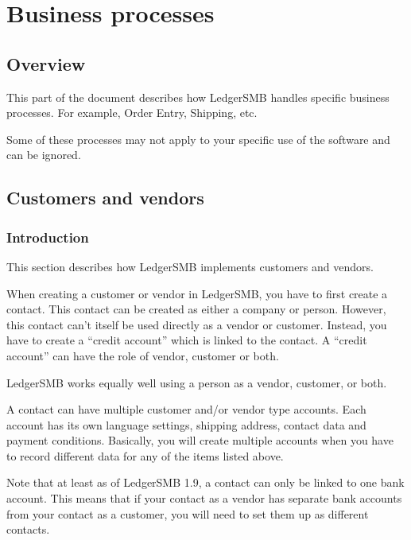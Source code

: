 
\part{Business processes}
\label{part-business-processes}

\chapter{Overview}
\label{cha-business-processes-overview}

This part of the document describes how LedgerSMB handles specific business processes.  For example, Order Entry, Shipping, etc.

Some of these processes may not apply to your specific use of the software and
can be ignored.

\chapter{Customers and vendors}
\label{cha-business-processes-customers}

\section{Introduction}
\label{sec-business-processes-customers-intro}

This section describes
how LedgerSMB implements \glspl{customer} and \glspl{vendor}.

When creating a customer or vendor in LedgerSMB, you have to first create a \gls{contact}. 
This contact can be created as either a \gls{company} or person.
However, this contact
can't itself be used directly as a \gls{vendor} or \gls{customer}. Instead, you have to create a ``\gls{credit account}''
which is linked to the contact. A ``\gls{credit account}'' can have the role of vendor, customer or both.

LedgerSMB works equally well using a person as a vendor, customer, or both.

A contact can have multiple \gls{customer} and/or \gls{vendor} type accounts. Each account has its
own language settings, shipping address, contact data and payment conditions.
Basically, you will create multiple accounts when you have to record different data
for any of the items listed above.

Note that at least as of LedgerSMB 1.9, a contact can only be linked to one bank account.  This means that if your contact as a vendor has separate bank accounts from your contact as a \gls{customer}, you will need to set them up as different contacts.

